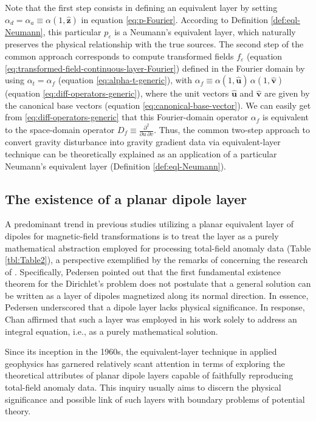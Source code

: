 \documentclass[manuscript,noblind]{geophysics}
\begin{document}
	Note that the first step consists in defining an equivalent layer 
	by setting $\alpha_{d} = \alpha_{a} \equiv \alpha(1, \hat{\mathbf{z}})$ in equation \ref{eq:p-Fourier}.
	According to Definition \ref{def:eql-Neumann}, this particular $p_{\varepsilon}$ is a Neumann's equivalent layer,
	which naturally preserves the physical relationship with the true sources.
	The second step of the common approach corresponds to 
	compute transformed fields $f_{\varepsilon}$ (equation \ref{eq:transformed-field-continuous-layer-Fourier}) 
	defined in the Fourier domain by using $\alpha_{t} = \alpha_{f}$ (equation \ref{eq:alpha-t-generic}), with 
	$\alpha_{f} \equiv \alpha(1, \hat{\mathbf{u}}) \, \alpha(1, \hat{\mathbf{v}})$ (equation \ref{eq:diff-operators-generic}), 
	where the unit vectors $\hat{\mathbf{u}}$ and $\hat{\mathbf{v}}$ are given by the canonical base vectors (equation \ref{eq:canonical-base-vector}).
	We can easily get from \ref{eq:diff-operators-generic} that this Fourier-domain operator $\alpha_{f}$ is equivalent to the 
	space-domain operator $D_{f} \equiv \tfrac{\partial^{2}}{\partial u \, \partial v}$.
	Thus, the common two-step approach to convert gravity disturbance into gravity
	gradient data via equivalent-layer technique can be theoretically explained as an application of 
	a particular Neumann's equivalent layer (Definition \ref{def:eql-Neumann}).
	
	
	\subsection{The existence of a planar dipole layer}
	
	
	A predominant trend in previous studies utilizing a planar equivalent layer of dipoles for magnetic-field transformations 
	is to treat the layer as a purely mathematical abstraction employed for processing total-field anomaly data (Table \ref{tbl:Table2}), 
	a perspective exemplified by the remarks of \citet{pedersen1989} concerning the research of 
	\citet{bhattacharyya_chan1977}.
	Specifically, Pedersen pointed out that the first fundamental existence theorem for the Dirichlet's 
	problem does not postulate that a general solution can be written as a layer of dipoles magnetized along its 
	normal direction. In essence, Pedersen underscored that a dipole layer lacks physical significance.
	In response, Chan affirmed that such a layer was employed in his work 
	solely to address an integral equation, i.e., as a purely mathematical solution.
	
	Since its inception in the 1960s, the equivalent-layer technique in applied geophysics has garnered 
	relatively scant attention in terms of exploring the theoretical attributes of planar dipole layers 
	capable of faithfully reproducing total-field anomaly data. 
	This inquiry usually aims to discern the physical significance and possible link of such layers 
	with boundary problems of potential theory.
	
\end{document}
